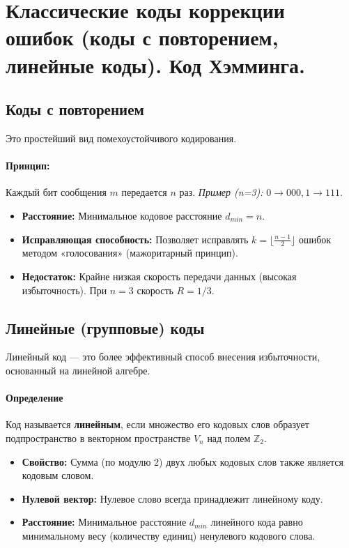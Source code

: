 \section{Классические коды коррекции ошибок (коды с повторением, линейные коды). Код Хэмминга.}

\subsection*{Коды с повторением}

Это простейший вид помехоустойчивого кодирования. 
\paragraph{Принцип:} Каждый бит сообщения $m$ передается $n$ раз.
\textit{Пример (n=3):} $0 \to 000, 1 \to 111$.
\begin{itemize}
    \item \textbf{Расстояние:} Минимальное кодовое расстояние $d_{min} = n$.
    \item \textbf{Исправляющая способность:} Позволяет исправлять $k = \lfloor \frac{n-1}{2} \rfloor$ ошибок методом «голосования» (мажоритарный принцип). 
    \item \textbf{Недостаток:} Крайне низкая скорость передачи данных (высокая избыточность). При $n=3$ скорость $R = 1/3$.
\end{itemize}

\subsection*{Линейные (групповые) коды}

Линейный код — это более эффективный способ внесения избыточности, основанный на линейной алгебре.

\paragraph{Определение}
Код называется \textbf{линейным}, если множество его кодовых слов образует подпространство в векторном пространстве $V_n$ над полем $\mathbb{Z}_2$.
\begin{itemize}
    \item \textbf{Свойство:} Сумма (по модулю 2) двух любых кодовых слов также является кодовым словом.
    \item \textbf{Нулевой вектор:} Нулевое слово всегда принадлежит линейному коду.
    \item \textbf{Расстояние:} Минимальное расстояние $d_{min}$ линейного кода равно минимальному весу (количеству единиц) ненулевого кодового слова.
\end{itemize}

